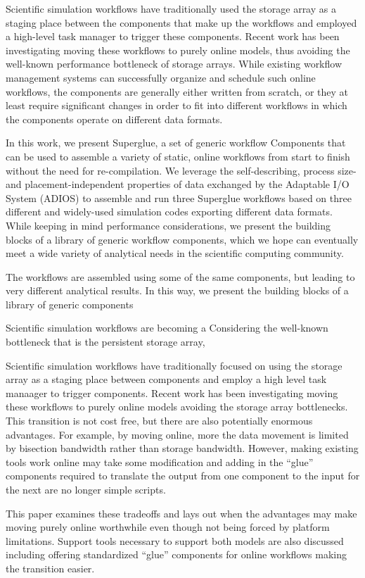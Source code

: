 Scientific simulation workflows have traditionally used
the storage array as a staging place between the components
that make up the workflows and employed a high-level
task manager to trigger these components.
Recent work has been investigating moving these
workflows to purely online models, thus avoiding the
well-known performance bottleneck of storage arrays.
While existing workflow management systems
can successfully organize and schedule such
online workflows, the components are generally
either written from scratch, or they at least require
significant changes in order to fit into different workflows
in which the components operate on different
data formats.

In this work, we present Superglue, a set of generic workflow
Components that can be used to assemble a variety of static,
online workflows from start to finish without the need for re-compilation.
We leverage the self-describing, process size- and placement-independent
properties of data exchanged by the Adaptable I/O System (ADIOS) to
assemble and run three Superglue workflows based on three
different and widely-used simulation codes exporting different data formats.
While keeping in mind performance considerations, we present the
building blocks of a library of generic workflow components, which
we hope can eventually meet a wide variety of analytical needs
in the scientific computing community.


The workflows are assembled using
some of the same components, but leading to very different analytical results.
In this way, we present the building blocks of a library of generic components


Scientific simulation workflows are becoming a 
Considering the well-known bottleneck that is the persistent storage array,


Scientific simulation workflows have traditionally focused on using the storage
array as a staging place between components and employ a high level task
manaager to trigger components. Recent work has been investigating moving these
workflows to purely online models avoiding the storage array bottlenecks. This
transition is not cost free, but there are also potentially enormous advantages.
For example, by moving online, more the data movement is limited by bisection
bandwidth rather than storage bandwidth. However, making existing tools work
online may take some modification and adding in the ``glue'' components required
to translate the output from one component to the input for the next are no
longer simple scripts.

This paper examines these tradeoffs and lays out when the advantages may make
moving purely online worthwhile even though not being forced by platform
limitations. Support tools necessary to support both models are also discussed
including offering standardized ``glue'' components for online workflows making
the transition easier.
\endif
